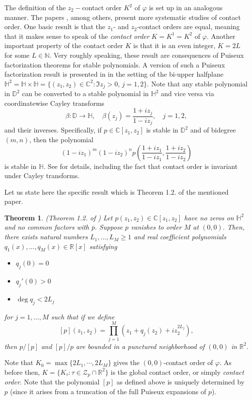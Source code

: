 \documentclass[11pt]{amsart}
\newtheorem{theorem}{Theorem}[section]
\numberwithin{equation}{section}
\begin{document}
The definition of the $z_2-$contact order $K^2$ of $\varphi$ is set up in an analogous manner.
The papers \cite{Pisa,Polonici}, among others, present more systematic studies of contact order. One basic 
result is that the $z_1$- and $z_2$-contact orders are
equal, meaning that it makes sense to speak of the {\it contact order} $K=K^1=K^2$ of $\varphi$.
Another important property of the contact order $K$ is that it is an even integer, $K=2L$ for some $L\in \mathbb{N}$. Very roughly speaking, these result are consequences of Puiseux factorization theorems for stable polynomials. A version of such a Puiseux factorization result is presented in \cite{Polonici} in the setting of the bi-upper halfplane $\mathbb{H}^2=\mathbb{H}\times \mathbb{H}=\{(z_1,z_2)\in \mathbb{C}^2\colon \Im z_j>0, \, j=1,2\}.$ Note that any stable polynomial in $\mathbb{D}^2$ can be converted to a stable polynomial in $\mathbb{H}^2$ and vice versa via coordinatewise Cayley transforms 
\[\beta \colon \mathbb{D}\to \mathbb{H}, \quad \beta(z_j)=\frac{1+iz_j}{1-iz_j}, \quad j=1,2,\]
and their inverses.
Specifically, if $p\in \mathbb{C}[z_1,z_2]$ is stable in $\mathbb{D}^2$ and of bidegree $(m,n)$, then the polynomial
\[(1-iz_1)^m(1-iz_2)^np\left(\frac{1+iz_1}{1-iz_1},\frac{1+iz_2}{1-iz_2} \right)\]
is stable in $\mathbb{H}$. See \cite{Pisa,Polonici} for details, including the fact that contact order is invariant under Cayley transforms.

Let us state here the specific result which is Theorem 1.2. of the mentioned paper.
\begin{theorem}(Theorem 1.2. of \cite{Polonici}) Let $p(z_1,z_2)\in\mathbb{C}[z_1,z_2]$ have no zeros on $\mathbb{H}^2$ and no common factors with $\overline{p}.$ Suppose $p$ vanishes to order $M$ at $(0,0).$ Then, there exists natural numbers $L_1,...,L_M\ge 1$ and real coefficient polynomials $q_1(x),...,q_M(x)\in\mathbb{R}[x]$ satisfying 
\begin{itemize}
\item $q_j(0)=0$ 
\item $q_j'(0)>0$
\item $\deg q_j<2L_j$
\end{itemize}
for $j=1,...,M$ such that if we define
$$[p](z_1,z_2)=\prod_{j=1}^M(z_1+q_j(z_2)+iz_2^{2L_j}),$$
then $p/[p]$ and $[p]/p$ are bounded in a punctured neighborhood of $(0,0)$ in $\mathbb{R}^2.$
\label{KneseLocal}
\end{theorem} Note that $K_0=\max\{2L_1, \cdots, 2L_M\}$ gives the $(0,0)$-contact order of $\varphi$.
As before then, $K=\{K_{\tau}\colon \tau \in \mathcal{Z}_{p}\cap \mathbb{R}^2\}$ is the global contact order, or simply \textit{contact order}. Note that the polynomial $[p]$ as defined above is uniquely determined by $p$ (since it arises from a truncation of the full Puiseux expansions of $p$).
\end{document}
